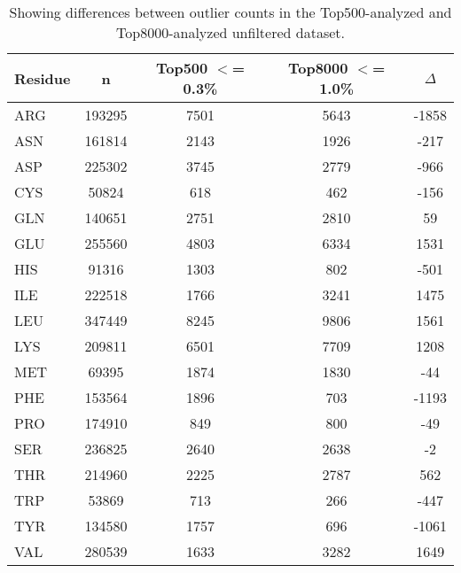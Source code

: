 \begin{table}[h!]
  \centering
  \vspace{-15pt}
  \begin{tabular}{lcccc}\\ \toprule
    Residue & n & Top500 $<$= 0.3\% & Top8000 $<$= 1.0\% & $\Delta$ \\ \midrule
    ARG    & 193295 & 7501   & 5643   & -1858  \\ \midrule
    ASN    & 161814 & 2143   & 1926   & -217   \\ \midrule
    ASP    & 225302 & 3745   & 2779   & -966   \\ \midrule
    CYS    & 50824  & 618    & 462    & -156   \\ \midrule
    GLN    & 140651 & 2751   & 2810   & 59     \\ \midrule
    GLU    & 255560 & 4803   & 6334   & 1531   \\ \midrule
    HIS    & 91316  & 1303   & 802    & -501   \\ \midrule
    ILE    & 222518 & 1766   & 3241   & 1475   \\ \midrule
    LEU    & 347449 & 8245   & 9806   & 1561   \\ \midrule
    LYS    & 209811 & 6501   & 7709   & 1208   \\ \midrule
    MET    & 69395  & 1874   & 1830   & -44    \\ \midrule
    PHE    & 153564 & 1896   & 703    & -1193  \\ \midrule
    PRO    & 174910 & 849    & 800    & -49    \\ \midrule
    SER    & 236825 & 2640   & 2638   & -2     \\ \midrule
    THR    & 214960 & 2225   & 2787   & 562    \\ \midrule
    TRP    & 53869  & 713    & 266    & -447   \\ \midrule
    TYR    & 134580 & 1757   & 696    & -1061  \\ \midrule
    VAL    & 280539 & 1633   & 3282   & 1649   \\ \midrule
  \end{tabular}
  \caption{Showing differences between outlier counts in the Top500-analyzed and Top8000-analyzed unfiltered dataset.}
  \label{tab:outliers}
\vspace{-15pt}
\end{table}
